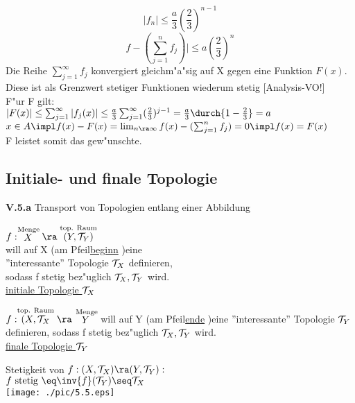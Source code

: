 \begin{satz}
{$$|f_n|\leq\frac{a}{3}(\frac{2}{3})^{n-1}$$
$$f-(\sum_{j=1}^n f_j)|\leq a(\frac{2}{3})^n$$
Die Reihe $\sum_{j=1}^\infty f_j$ konvergiert gleichm"a"sig auf X gegen eine Funktion $F(x)$. Diese ist als Grenzwert stetiger Funktionen wiederum stetig [Analysis-VO!] \\
F"ur F gilt:\\
$|F(x)|\leq\sum_{j=1}^\infty |f_j(x)|\leq\frac{a}{3}\sum_{j=1}^\infty (\frac{2}{3})^{j-1}=\frac{a}{3}\durch{1-\frac{2}{3}}=a$\\
$x\in A\impl f(x)-F(x)=\lim_{n\ra\infty} f(x)-(\sum_{j=1}^n f_j)=0\impl f(x)=F(x)$\\
F leistet somit das gew"unschte.}
\end{satz}
\subsection{Initiale- und finale Topologie}
\setcounter{definition}{5}
{\bf V.5.a }\label{5.5.a}{\sc Transport von Topologien entlang einer Abbildung}\vspace*{0.4cm}\\
\begin{minipage}{7cm}
$f:\stackrel{\mbox{\scriptsize Menge}}{X}\ra \stackrel{\mbox{\scriptsize top. Raum}}{(Y,\T_Y)}$\\
will auf X (am Pfeil\ul{beginn} )eine\\
''interessante'' Topologie $\mathcal T_X$ definieren,\\
sodass f stetig bez"uglich $\mathcal T_X,\mathcal T_Y$ wird.\\
\ul{initiale Topologie $\mathcal T_X$}
\end{minipage}\hspace*{0.5cm}
\begin{minipage}{7cm}
$f:\stackrel{\mbox{\scriptsize top. Raum}}{(X,\T_X}\ra \stackrel{\mbox{\scriptsize Menge}}{Y}$
will auf Y (am Pfeil\ul{ende} )eine ''interessante'' Topologie $\mathcal T_Y$ definieren, sodass f stetig bez"uglich $\mathcal T_X,\mathcal T_Y$ wird.\\
\ul{finale Topologie $\mathcal T_Y$}
\end{minipage}
Stetigkeit von $f:(X,\T_X)\ra(Y,\T_Y):$\\
\hspace*{5cm}$f \mbox{ stetig }\eq\inv{f}(\T_Y)\seq\T_X$\\
\hspace*{6cm}\texttt{[image: ./pic/5.5.eps]}\\

